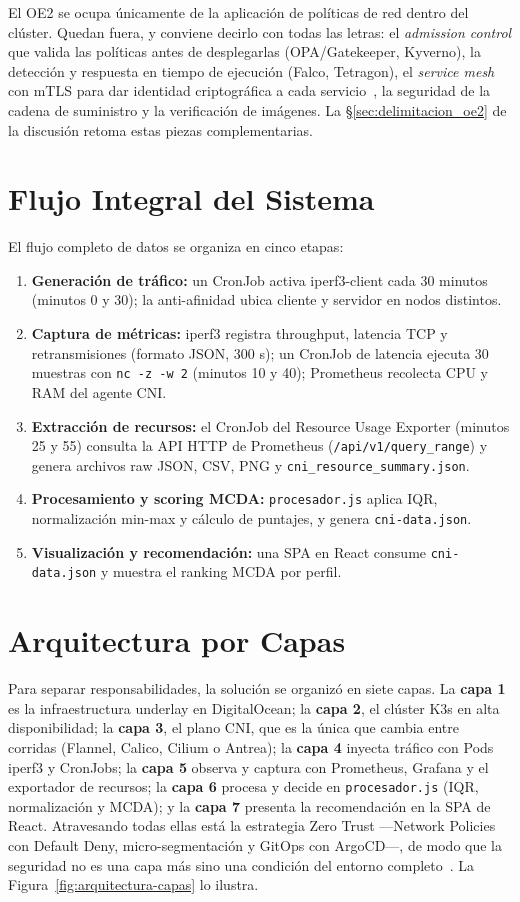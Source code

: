 El OE2 se ocupa únicamente de la aplicación de políticas de red dentro del clúster. Quedan fuera, y conviene decirlo con todas las letras: el \emph{admission control} que valida las políticas antes de desplegarlas (OPA/Gatekeeper, Kyverno), la detección y respuesta en tiempo de ejecución (Falco, Tetragon), el \emph{service mesh} con mTLS para dar identidad criptográfica a cada servicio~\cite{ref26}, la seguridad de la cadena de suministro y la verificación de imágenes. La \S\ref{sec:delimitacion_oe2} de la discusión retoma estas piezas complementarias.

\section{Flujo Integral del Sistema}

El flujo completo de datos se organiza en cinco etapas:
\begin{enumerate}
\item \textbf{Generación de tráfico:} un CronJob activa iperf3-client cada 30 minutos (minutos 0 y 30); la anti-afinidad ubica cliente y servidor en nodos distintos.
\item \textbf{Captura de métricas:} iperf3 registra throughput, latencia TCP y retransmisiones (formato JSON, 300 s); un CronJob de latencia ejecuta 30 muestras con \texttt{nc -z -w 2} (minutos 10 y 40); Prometheus recolecta CPU y RAM del agente CNI.
\item \textbf{Extracción de recursos:} el CronJob del Resource Usage Exporter (minutos 25 y 55) consulta la API HTTP de Prometheus (\texttt{/api/v1/query\_range}) y genera archivos raw JSON, CSV, PNG y \texttt{cni\_resource\_summary.json}.
\item \textbf{Procesamiento y scoring MCDA:} \texttt{procesador.js} aplica IQR, normalización min-max y cálculo de puntajes, y genera \texttt{cni-data.json}.
\item \textbf{Visualización y recomendación:} una SPA en React consume \texttt{cni-data.json} y muestra el ranking MCDA por perfil.
\end{enumerate}

\section{Arquitectura por Capas}

Para separar responsabilidades, la solución se organizó en siete capas. La \textbf{capa 1} es la infraestructura underlay en DigitalOcean; la \textbf{capa 2}, el clúster K3s en alta disponibilidad; la \textbf{capa 3}, el plano CNI, que es la única que cambia entre corridas (Flannel, Calico, Cilium o Antrea); la \textbf{capa 4} inyecta tráfico con Pods iperf3 y CronJobs; la \textbf{capa 5} observa y captura con Prometheus, Grafana y el exportador de recursos; la \textbf{capa 6} procesa y decide en \texttt{procesador.js} (IQR, normalización y MCDA); y la \textbf{capa 7} presenta la recomendación en la SPA de React. Atravesando todas ellas está la estrategia Zero Trust ---Network Policies con Default Deny, micro-segmentación y GitOps con ArgoCD---, de modo que la seguridad no es una capa más sino una condición del entorno completo~\cite{ref16}. La Figura~\ref{fig:arquitectura-capas} lo ilustra.

